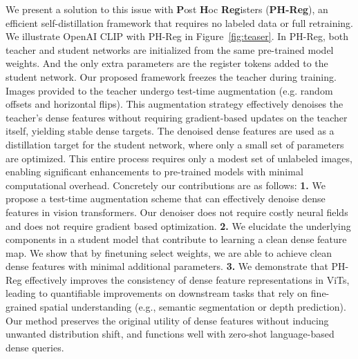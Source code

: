 We present a solution to this issue with \textbf{P}ost \textbf{H}oc \textbf{Reg}isters (\textbf{PH-Reg}), an efficient self-distillation framework that requires no labeled data or full retraining. We illustrate OpenAI CLIP with PH-Reg in Figure~\ref{fig:teaser}. In PH-Reg, both teacher and student networks are initialized from the same pre-trained model weights. And the only extra parameters are the register tokens added to the student network. Our proposed framework freezes the teacher during training. Images provided to the teacher undergo test-time augmentation (e.g. random offsets and horizontal flips). This augmentation strategy effectively denoises the teacher's dense features without requiring gradient-based updates on the teacher itself, yielding stable dense targets. The denoised dense features are used as a distillation target for the student network, where only a small set of parameters are optimized. This entire process requires only a modest set of unlabeled images, enabling significant enhancements to pre-trained models with minimal computational overhead. Concretely our contributions are as follows: \textbf{1.} We propose a test-time augmentation scheme that can effectively denoise dense features in vision transformers. Our denoiser does not require costly neural fields and does not require gradient based optimization. \textbf{2.} We elucidate the underlying components in a student model that contribute to learning a clean dense feature map. We show that by finetuning select weights, we are able to achieve clean dense features with minimal additional parameters. \textbf{3.} We demonstrate that PH-Reg effectively improves the consistency of dense feature representations in ViTs, leading to quantifiable improvements on downstream tasks that rely on fine-grained spatial understanding (e.g., semantic segmentation or depth prediction). Our method preserves the original utility of dense features without inducing unwanted distribution shift, and functions well with zero-shot language-based dense queries. 
